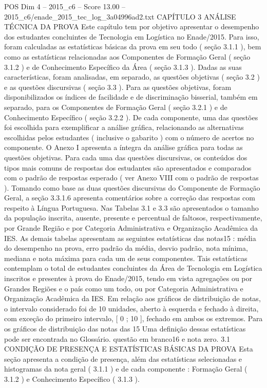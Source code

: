 \begin{textsample}{POS Dim 4 – 2015\_c6 – Score 13.00 – 2015\_c6/enade\_2015\_tec\_log\_3a04996ad2.txt}  \label{ex:f4_pos_025}
CAPÍTULO 3 ANÁLISE TÉCNICA DA PROVA Este capítulo tem por objetivo apresentar o desempenho dos estudantes concluintes de Tecnologia em Logística no Enade/2015.
Para isso, foram calculadas as estatísticas básicas da prova em seu todo ( seção 3.1.1 ), bem como as estatísticas relacionadas aos Componentes de Formação Geral ( seção 3.1.2 ) e de Conhecimento Específico da Área ( seção 3.1.3 ).
Dadas as suas características, foram analisadas, em separado, as questões objetivas ( seção 3.2 ) e as questões discursivas ( seção 3.3 ).
Para as questões objetivas, foram disponibilizados os índices de facilidade e de discriminação bisserial, também em separado, para os Componentes de Formação Geral ( seção 3.2.1 ) e de Conhecimento Específico ( seção 3.2.2 ).
De cada componente, uma das questões foi escolhida para exemplificar a análise gráfica, relacionando as alternativas escolhidas pelos estudantes ( inclusive o gabarito ) com o número de acertos no componente.
O Anexo I apresenta a íntegra da análise gráfica para todas as questões objetivas.
Para cada uma das questões discursivas, os conteúdos dos tipos mais comuns de respostas dos estudantes são apresentados e comparados com o padrão de respostas esperado ( ver Anexo VIII com o padrão de respostas ).
Tomando como base as duas questões discursivas do Componente de Formação Geral, a seção 3.3.1.6 apresenta comentários sobre a correção das respostas com respeito à Língua Portuguesa.
Nas Tabelas 3.1 e 3.3 são apresentados o tamanho da população inscrita, ausente, presente e percentual de faltosos, respectivamente, por Grande Região e por Categoria Administrativa e Organização Acadêmica da IES.
As demais tabelas apresentam as seguintes estatísticas das notas15 : média do desempenho na prova, erro padrão da média, desvio padrão, nota mínima, mediana e nota máxima para cada um de seus componentes.
Tais estatísticas contemplam o total de estudantes concluintes da Área de Tecnologia em Logística inscritos e presentes à prova do Enade/2015, tendo em vista agregações ou por Grandes Regiões e o país como um todo, ou por Categoria Administrativa e Organização Acadêmica da IES.
Em relação aos gráficos de distribuição de notas, o intervalo considerado foi de 10 unidades, aberto à esquerda e fechado à direita, com exceção do primeiro intervalo, [ 0 ; 10 ], fechado em ambos os extremos.
Para os gráficos de distribuição das notas das 15 Uma definição dessas estatísticas pode ser encontrada no Glossário. questão em branco16 e nota zero. 3.1 CONDIÇÃO DE PRESENÇA E ESTATÍSTICAS BÁSICAS DA PROVA Esta seção apresenta a condição de presença, além das estatísticas selecionadas e histogramas da nota geral ( 3.1.1 ) e de cada componente : Formação Geral ( 3.1.2 ) e Conhecimento Específico ( 3.1.3 ).

\end{textsample}
